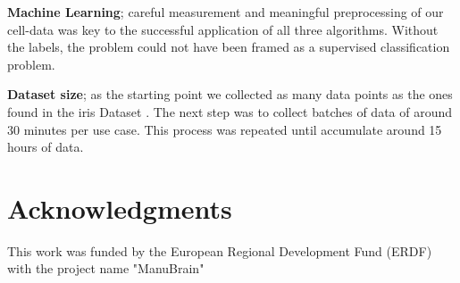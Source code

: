 \documentclass[5p,times,procedia]{elsarticle}
\begin{document}
\textbf{Machine Learning}; careful measurement and  meaningful preprocessing
of our cell-data was key to the successful application of all three algorithms.
Without the labels, the problem could not have been framed as a supervised 
classification problem.

\textbf{Dataset size}; as the starting point we collected as many data points as the ones found in the iris Dataset \cite{fisher_1936}. The next step was to collect batches of data of around 30 minutes per use case. This process was repeated until accumulate around 15 hours of data.

\section*{Acknowledgments}
This work was funded by the European Regional Development Fund (ERDF) with the project name "ManuBrain" 


\end{document}

